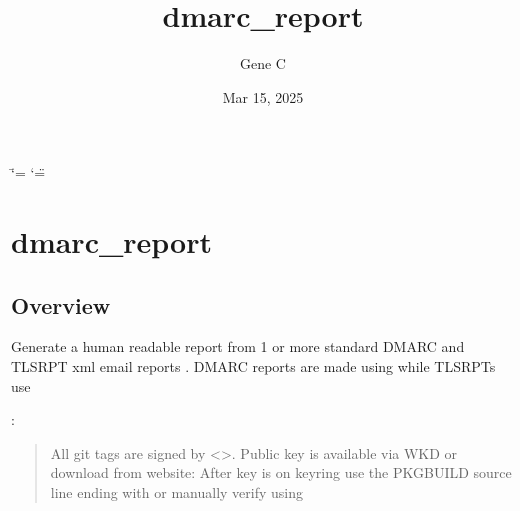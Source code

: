 \documentclass[letterpaper,10pt,english]{sphinxmanual}
\title{dmarc\_report}
\date{Mar 15, 2025}
\author{Gene C}
\begin{document}
\ifdefined\shorthandoff
  \ifnum\catcode`\=\string=\active\shorthandoff{=}\fi
  \ifnum\catcode`\"=\active{}\fi
\fi

\pagestyle{empty}
\sphinxmaketitle
\pagestyle{plain}
\sphinxtableofcontents
\pagestyle{normal}
\label{\detokenize{index::doc}}


\sphinxstepscope


\chapter{dmarc\_report}
\label{\detokenize{README:dmarc-report}}\label{\detokenize{README::doc}}

\section{Overview}
\label{\detokenize{README:overview}}
\sphinxAtStartPar
Generate a human readable report from 1 or more standard DMARC and TLS\sphinxhyphen{}RPT xml email reports .
DMARC reports are made using  while TLS\sphinxhyphen{}RPTs use 

\sphinxAtStartPar
{}:
\begin{quote}

\sphinxAtStartPar
All git tags are signed by \textless{}\textgreater{}.
Public key is available via WKD or download from website:
After key is on keyring use the PKGBUILD source line ending with 
or manually verify using 
\end{quote}
\end{document}
